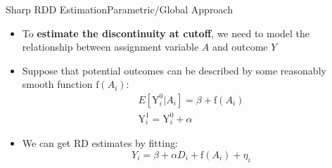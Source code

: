 \documentclass[hyperref={pdfpagelabels=false}]{beamer}
\begin{document}
\begin{frame}{Sharp RDD Estimation}{Parametric/Global Approach}
	\begin{itemize}
		\item To \textbf{estimate the discontinuity at cutoff}, we need to model the relationship between assignment variable $A$ and outcome $Y$
		\vspace{0.2cm}
		\item Suppose that potential outcomes can be described by some reasonably smooth function $\mathrm{f}(A_i)$:
		\begin{align*}
		E[\mathrm{Y}^{0}_{i}|A_i]=\beta+ \mathrm{f}(A_i) \\
		\mathrm{Y}^{1}_{i} = \mathrm{Y}^{0}_{i}+\alpha
		\end{align*}
		
		\item We can get RD estimates by fitting:
		\begin{equation*}
		Y_i=\beta +\alpha D_i+\mathrm{f}(A_i)+\eta_i
		\end{equation*}
		
	\end{itemize}
\end{frame}
\end{document}
